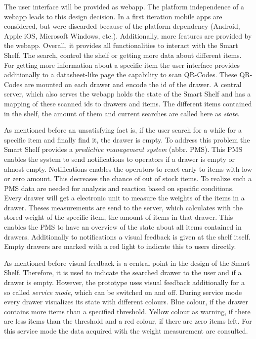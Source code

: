 The user interface will be provided as webapp. 
The platform independence of a webapp leads to this design decision. 
In a first iteration mobile apps are considered, but were discarded because of the platform dependency (Android, Apple iOS, Microsoft Windows, etc.). 
Additionally, more features are provided by the webapp. 
Overall, it provides all functionalities to interact with the Smart Shelf. 
The search, control the shelf or getting more data about different items. 
For getting more information about a specific item the user interface provides additionally to a datasheet-like page the capability to scan QR-Codes. 
These QR-Codes are mounted on each drawer and encode the id of the drawer. 
A central server, which also serves the webapp holds the state of the Smart Shelf and has a mapping of these scanned ids to drawers and items. 
The different items contained in the shelf, the amount of them and current searches are called here as \textit{state}. 

As mentioned before an unsatisfying fact is, if the user search for a while for a specific item and finally find it, the drawer is empty. 
To address this problem the Smart Shelf provides a \textit{predictive management system} (abbr. PMS). 
This PMS enables the system to send notifications to operators if a drawer is empty or almost empty. 
Notifications enables the operators to react early to items with low or zero amount. 
This decreases the chance of out of stock items. 
To realize such a PMS data are needed for analysis and reaction based on specific conditions. 
Every drawer will get a electronic unit to measure the weights of the items in a drawer. 
Theses measurements are send to the server, which calculates with the stored weight of the specific item, the amount of items in that drawer. 
This enables the PMS to have an overview of the state about all items contained in drawers. 
Additionally to notifications a visual feedback is given at the shelf itself. 
Empty drawers are marked with a red light to indicate this to users directly. 

As mentioned before visual feedback is a central point in the design of the Smart Shelf. 
Therefore, it is used to indicate the searched drawer to the user and if a drawer is empty. 
However, the prototype uses visual feedback additionally for a so called \textit{service mode}, which can be switched on and off.
During service mode every drawer visualizes its state with different colours. 
Blue colour, if the drawer contains more items than a specified threshold. 
Yellow colour as warning, if there are less items than the threshold and a red colour, if there are zero items left. 
For this service mode the data acquired with the weight measurement are consulted. 

